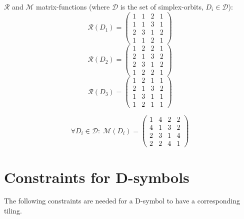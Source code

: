 \begin{frame}
  $\mathcal{R}$ and $\mathcal{M}$ matrix-functions (where $\mathcal{D}$ is the set
  of simplex-orbits, $D_i\in\mathcal{D}$):
  \begin{equation*}
    \mathcal{R}(D_1)=
    \left(
    \begin{array}{cccc}
      1 & 1 & 2 & 1\\
      1 & 1 & 3 & 1\\
      2 & 3 & 1 & 2\\
      1 & 1 & 2 & 1
    \end{array}
    \right)
  \end{equation*}
  \begin{equation*}
    \mathcal{R}(D_2)=
    \left(
    \begin{array}{cccc}
      1 & 2 & 2 & 1\\
      2 & 1 & 3 & 2\\
      2 & 3 & 1 & 2\\
      1 & 2 & 2 & 1
    \end{array}
    \right)
  \end{equation*}
  \begin{equation*}
    \mathcal{R}(D_3)=
    \left(
    \begin{array}{cccc}
      1 & 2 & 1 & 1\\
      2 & 1 & 3 & 2\\
      1 & 3 & 1 & 1\\
      1 & 2 & 1 & 1
    \end{array}
    \right)
  \end{equation*}

  \begin{equation*}
    \forall D_i\in\mathcal{D}:\;
    \mathcal{M}(D_i)=
    \left(
    \begin{array}{cccc}
      1 & 4 & 2 & 2\\
      4 & 1 & 3 & 2\\
      2 & 3 & 1 & 4\\
      2 & 2 & 4 & 1
    \end{array}
    \right)
  \end{equation*}
\end{frame}

\section{Constraints for D-symbols}
The following constraints are needed for a D-symbol to have a corresponding
tiling.

